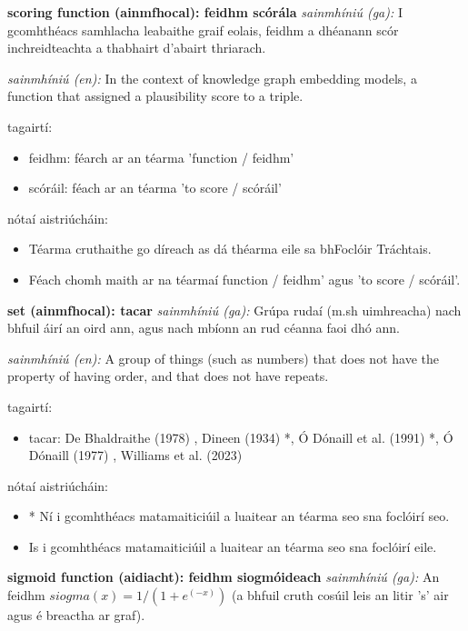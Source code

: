 \documentclass{article}
\begin{document}
\textbf{scoring function (ainmfhocal): feidhm scórála}
\textit{sainmhíniú (ga):} I gcomhthéacs samhlacha leabaithe graif eolais, feidhm a dhéanann scór inchreidteachta a thabhairt d'abairt thriarach.

\textit{sainmhíniú (en):} In the context of knowledge graph embedding models, a function that assigned a plausibility score to a triple.

tagairtí:
\begin{itemize}
	\item feidhm: féarch ar an téarma 'function / feidhm'
	\item scóráil: féach ar an téarma 'to score / scóráil'
\end{itemize}

nótaí aistriúcháin:
\begin{itemize}
	\item Téarma cruthaithe go díreach as dá théarma eile sa bhFoclóir Tráchtais.
	\item Féach chomh maith ar na téarmaí function / feidhm' agus 'to score / scóráil'.
\end{itemize}


\textbf{set (ainmfhocal): tacar}
\textit{sainmhíniú (ga):} Grúpa rudaí (m.sh uimhreacha) nach bhfuil áirí an oird ann, agus nach mbíonn an rud céanna faoi dhó ann.

\textit{sainmhíniú (en):} A group of things (such as numbers) that does not have the property of having order, and that does not have repeats.

tagairtí:
\begin{itemize}
	\item tacar: De Bhaldraithe (1978) \cite{de-bhaldraithe}, Dineen (1934) \cite{dineen}*, Ó Dónaill et al. (1991) \cite{focloir-beag}*, Ó Dónaill (1977) \cite{odonaill}, Williams et al. (2023) \cite{storchiste}
\end{itemize}

nótaí aistriúcháin:
\begin{itemize}
	\item * Ní i gcomhthéacs matamaiticiúil a luaitear an téarma seo sna foclóirí seo.
	\item Is i gcomhthéacs matamaiticiúil a luaitear an téarma seo sna foclóirí eile.
\end{itemize}


\textbf{sigmoid function (aidiacht): feidhm siogmóideach}
\textit{sainmhíniú (ga):} An feidhm $siogma(x) = 1 / (1 + e^(-x))$ (a bhfuil cruth cosúil leis an litir 's' air agus é breactha ar graf).
\end{document}
